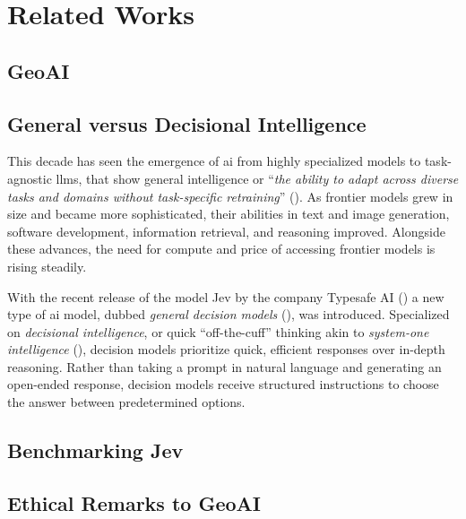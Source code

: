 \chapter{Related Works}

\section{GeoAI}

\section{General versus Decisional Intelligence}
This decade has seen the emergence of \gls{ai} from highly specialized models to task-agnostic \gls{llms}, that show general intelligence or \enquote{\textit{the ability to adapt across diverse tasks and domains without task-specific retraining}} (\cite[p.2]{duanGeneralDecisionModels2026}). As frontier models grew in size and became more sophisticated, their abilities in text and image generation, software development, information retrieval, and reasoning improved. Alongside these advances, the need for compute and price of accessing frontier models is rising steadily. 

With the recent release of the model Jev by the company Typesafe AI (\cite{IntroducingSystemOne}) a new type of \gls{ai} model, dubbed \textit{general decision models} (\cite{duanGeneralDecisionModels2026}), was introduced. Specialized on \textit{decisional intelligence}, or quick \enquote{off-the-cuff} thinking akin to \textit{system-one intelligence} (\cite{kahnemanThinkingFastSlow2011}), decision models prioritize quick, efficient responses over in-depth reasoning. Rather than taking a prompt in natural language and generating an open-ended response, decision models receive structured instructions to choose the answer between predetermined options.



\section{Benchmarking Jev}

\section{Ethical Remarks to GeoAI}


